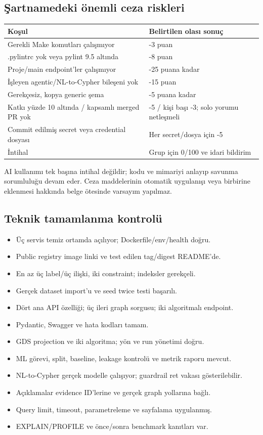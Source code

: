 \documentclass[11pt,a4paper]{article}
\newcommand{\checkitem}{\item[$\square$]}
\begin{document}
\subsection{Şartnamedeki önemli ceza riskleri}
\begin{tabularx}{\linewidth}{@{}YP{43mm}@{}}\toprule
\textbf{Koşul} & \textbf{Belirtilen olası sonuç}\\\midrule
Gerekli Make komutları çalışmıyor & -3 puan\\
.pylintrc yok veya pylint 9.5 altında & -8 puan\\
Proje/main endpoint'ler çalışmıyor & -25 puana kadar\\
İşleyen agentic/NL-to-Cypher bileşeni yok & -15 puan\\
Gerekçesiz, kopya generic şema & -5 puana kadar\\
Katkı yüzde 10 altında / kapsamlı merged PR yok & -5 / kişi başı -3; solo yorumu netleşmeli\\
Commit edilmiş secret veya credential dosyası & Her secret/dosya için -5\\
İntihal & Grup için 0/100 ve idari bildirim\\\bottomrule
\end{tabularx}
AI kullanımı tek başına intihal değildir; kodu ve mimariyi anlayıp savunma sorumluluğu devam eder. Ceza maddelerinin otomatik uygulanışı veya birbirine eklenmesi hakkında belge ötesinde varsayım yapılmaz.

\subsection{Teknik tamamlanma kontrolü}
\begin{itemize}
\checkitem Üç servis temiz ortamda açılıyor; Dockerfile/env/health doğru.
\checkitem Public registry image linki ve test edilen tag/digest README'de.
\checkitem En az üç label/üç ilişki, iki constraint; indeksler gerekçeli.
\checkitem Gerçek dataset import'u ve seed twice testi başarılı.
\checkitem Dört ana API özelliği; üç ileri graph sorgusu; iki algoritmalı endpoint.
\checkitem Pydantic, Swagger ve hata kodları tamam.
\checkitem GDS projection ve iki algoritma; yön ve run yönetimi doğru.
\checkitem ML görevi, split, baseline, leakage kontrolü ve metrik raporu mevcut.
\checkitem NL-to-Cypher gerçek modelle çalışıyor; guardrail ret vakası gösterilebilir.
\checkitem Açıklamalar evidence ID'lerine ve gerçek graph yollarına bağlı.
\checkitem Query limit, timeout, parametreleme ve sayfalama uygulanmış.
\checkitem EXPLAIN/PROFILE ve önce/sonra benchmark kanıtları var.
\end{itemize}
\end{document}

